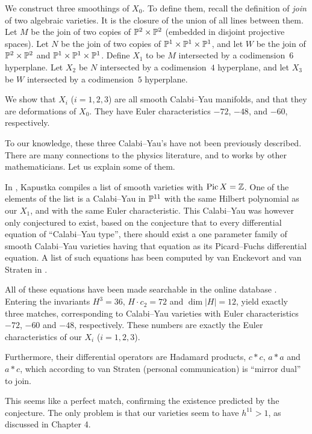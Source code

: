 We construct three smoothings of $X_0$. To define them, recall the definition of \emph{join} of two algebraic varieties. It is the closure of the union of all lines between them. Let $M$ be the join of two copies of $\P^2 \times \P^2$ (embedded in disjoint projective spaces). Let $N$ be the join of two copies of $\P^1 \times \P^1 \times \P^1$, and let $W$ be the join of $\P^2 \times \P^2$ and $\P^1 \times \P^1 \times \P^1$. Define $X_1$ to be $M$ intersected by a codimension~$6$ hyperplane. Let $X_2$ be $N$ intersected by a codimension~$4$ hyperplane, and let $X_3$ be $W$ intersected by a codimension~$5$ hyperplane. 

We show that $X_i$ ($i=1,2,3$) are all smooth Calabi--Yau manifolds, and that they are deformations of $X_0$. They have Euler characteristics $-72$, $-48$, and $-60$, respectively. 

To our knowledge, these three Calabi--Yau's have not been previously described. There are many connections to the physics literature, and to works by other mathematicians. Let us explain some of them.

In \cite{kapustka_delpezzo}, Kapustka compiles a list of smooth \CY varieties with $\Pic X = \Z$. One of the elements of the list is a Calabi--Yau in $\P^{11}$ with the same Hilbert polynomial as our $X_1$, and with the same Euler characteristic. This Calabi--Yau was however only conjectured to exist, based on the conjecture that to every differential equation of ``Calabi--Yau type'', there should exist a one parameter family of smooth Calabi--Yau varieties having that equation as its Picard--Fuchs differential equation. A list of such equations has been computed by van Enckevort and van Straten in \cite{monodromy_straten}.

All of these equations have been made searchable in the online database \cite{cy_database}. Entering the invariants $H^3=36$, $H \cdot c_2 = 72$ and $\dim |H|=12$, yield exactly three matches, corresponding to Calabi--Yau varieties with Euler characteristics $-72$, $-60$ and $-48$, respectively. These numbers are exactly the Euler characteristics of our $X_i$ ($i=1,2,3$).

Furthermore, their differential operators are Hadamard products, $c \ast c$, $a \ast a$ and $a \ast c$, which according to van Straten (personal communication) is ``mirror dual'' to join.

This seems like a perfect match, confirming the existence predicted by the conjecture. The only problem is that our varieties seem to have $h^{11} > 1$, as discussed in Chapter 4.


